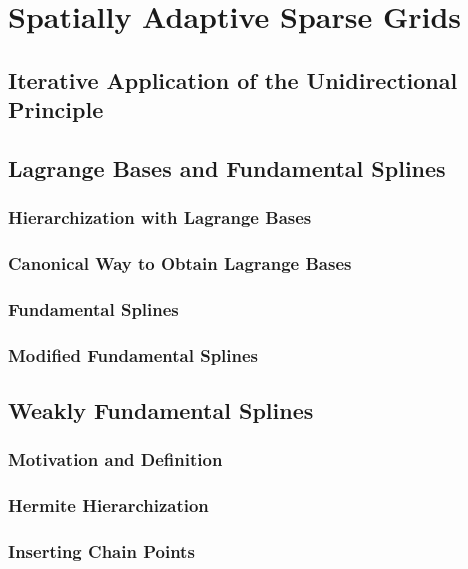 \section{Spatially Adaptive Sparse Grids}

\blindtext{}

\subsection{Iterative Application of the Unidirectional Principle}

\blindtext{}

\subsection{Lagrange Bases and Fundamental Splines}

\blindtext{}

\subsubsection{Hierarchization with Lagrange Bases}

\blindtext{}

\subsubsection{Canonical Way to Obtain Lagrange Bases}

\blindtext{}

\subsubsection{Fundamental Splines}

\blindtext{}

\subsubsection{Modified Fundamental Splines}

\blindtext{}

\subsection{Weakly Fundamental Splines}

\blindtext{}

\subsubsection{Motivation and Definition}

\blindtext{}

\subsubsection{Hermite Hierarchization}

\blindtext{}

\subsubsection{Inserting Chain Points}

\blindtext{}
